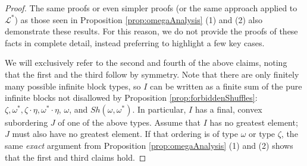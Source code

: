 \documentclass[11pt]{amsart}
\theoremstyle{definition}
\def\L{\mathcal L}
\begin{document}
\begin{proof}
   The same proofs or even simpler proofs (or the same approach applied to $\L^*$) as those seen in Proposition \ref{prop:omegaAnalysis} (1) and (2) also demonstrate these results.
   For this reason, we do not provide the proofs of these facts in complete detail, instead preferring to highlight a few key cases.

    We will exclusively refer to the second and fourth of the above claims, noting that the first and the third follow by symmetry.
    Note that there are only finitely many possible infinite block types, so $I$ can be written as a finite sum of the pure infinite blocks not disallowed by Proposition \ref{prop:forbiddenShuffles}: $\zeta, \omega^*, \zeta\cdot\eta, \omega^*\cdot\eta$, $\omega$, and $Sh(\omega,\omega^*)$.
    In particular, $I$ has a final, convex subordering $J$ of one of the above types.
    Assume that $I$ has no greatest element; $J$ must also have no greatest element.
    If that ordering is of type $\omega$ or type $\zeta$, the same \textit {exact} argument from Proposition \ref{prop:omegaAnalysis} (1) and (2) shows that the first and third claims hold.


\end{proof}
\end{document}
